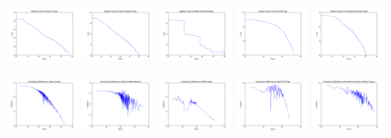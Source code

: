 \documentclass[12pt]{article}
\begin{document}
\begin{figure}
  \includegraphics[width=0.19\textwidth]{degree_plot}
  \includegraphics[width=0.19\textwidth]{overflow_degree_plot}
  \includegraphics[width=0.19\textwidth]{miller_degree_plot}
  \includegraphics[width=0.19\textwidth]{pos_degree_plot}
  \includegraphics[width=0.19\textwidth]{kron_degree_plot}

  \includegraphics[width=0.19\textwidth]{clustering_coeff}
  \includegraphics[width=0.19\textwidth]{overflow_clustering_coeff}
  \includegraphics[width=0.19\textwidth]{miller_clustering_coeff}
  \includegraphics[width=0.19\textwidth]{pos_clustering_coeff}
  \includegraphics[width=0.19\textwidth]{kron_clustering_coeff}
  

\end{figure}
\end{document}
